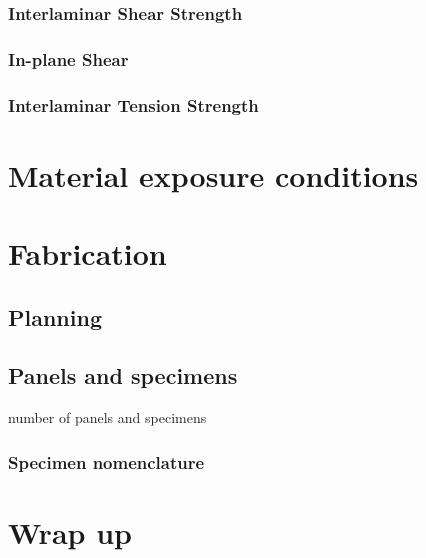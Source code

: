 \subsubsection{Interlaminar Shear Strength}
\label{ilss}

\subsubsection{In-plane Shear}
\label{ips}

\subsubsection{Interlaminar Tension Strength}
\label{ilts}

\section{Material exposure conditions}
\label{expcond}

\section{Fabrication}
\label{testfabrication}

\subsection{Planning}
\label{plan}

\subsection{Panels and specimens}
\label{panels}
number of panels and specimens

\subsubsection{Specimen nomenclature}
\label{nomenclature}

\section{Wrap up}
\label{summary}

